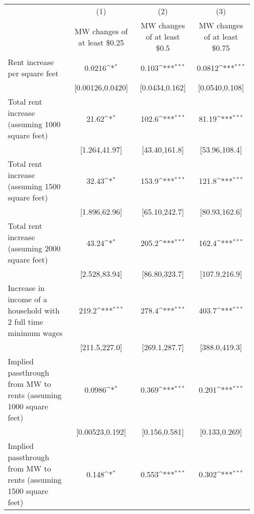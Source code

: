 {
\def\sym#1{\ifmmode^{#1}\else\(^{#1}\)\fi}
\begin{tabular}{l*{3}{c}}
\hline\hline
            &\multicolumn{1}{c}{(1)}        &\multicolumn{1}{c}{(2)}        &\multicolumn{1}{c}{(3)}        \\
            &\multicolumn{1}{c}{MW changes of at least \$0.25}&\multicolumn{1}{c}{MW changes of at least \$0.5}&\multicolumn{1}{c}{MW changes of at least \$0.75}\\
\hline
Rent increase per square feet&                0.0216\sym{*}  &                 0.103\sym{***}&                0.0812\sym{***}\\
            &      [0.00126,0.0420]         &        [0.0434,0.162]         &        [0.0540,0.108]         \\
[1em]
Total rent increase (assuming 1000 square feet)&                 21.62\sym{*}  &                 102.6\sym{***}&                 81.19\sym{***}\\
            &         [1.264,41.97]         &         [43.40,161.8]         &         [53.96,108.4]         \\
[1em]
Total rent increase (assuming 1500 square feet)&                 32.43\sym{*}  &                 153.9\sym{***}&                 121.8\sym{***}\\
            &         [1.896,62.96]         &         [65.10,242.7]         &         [80.93,162.6]         \\
[1em]
Total rent increase (assuming 2000 square feet)&                 43.24\sym{*}  &                 205.2\sym{***}&                 162.4\sym{***}\\
            &         [2.528,83.94]         &         [86.80,323.7]         &         [107.9,216.9]         \\
[1em]
Increase in income of a household with 2 full time minimum wages&                 219.2\sym{***}&                 278.4\sym{***}&                 403.7\sym{***}\\
            &         [211.5,227.0]         &         [269.1,287.7]         &         [388.0,419.3]         \\
[1em]
Implied passthrough from MW to rents (assuming 1000 square feet)&                0.0986\sym{*}  &                 0.369\sym{***}&                 0.201\sym{***}\\
            &       [0.00523,0.192]         &         [0.156,0.581]         &         [0.133,0.269]         \\
[1em]
Implied passthrough from MW to rents (assuming 1500 square feet)&                 0.148\sym{*}  &                 0.553\sym{***}&                 0.302\sym{***}\\

\end{tabular}}
